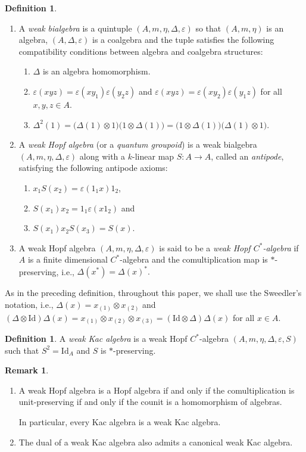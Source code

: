 \documentclass{amsart}
\theoremstyle{definition}
\newtheorem{definition}[theorem]{Definition}
\theoremstyle{theorem}
\newtheorem{remark}[theorem]{Remark}
\newcommand{\ot}{\otimes}
\begin{document}
\begin{definition}\cite{NSW,BNS}
  \begin{enumerate}
    \item A \textit{weak bialgebra} is a quintuple
      $(A,m,\eta,\Delta,\varepsilon)$ so that $(A,m,\eta)$ is an algebra,
      $(A,\Delta,\varepsilon)$ is a coalgebra and the tuple satisfies the
      following compatibility conditions between algebra and coalgebra
      structures:
  \begin{enumerate}
  \item $\Delta$ is an algebra homomorphism.
  \item
  $\varepsilon(xyz)=\varepsilon(xy_1)\varepsilon(y_2z)$
  and $\varepsilon(xyz)=\varepsilon(xy_2)\varepsilon(y_1z)$  for all $x,y, z\in A$.
  \item ${\Delta}^2(1)=\big(\Delta(1)\otimes 1\big)\big(1\otimes \Delta(1)\big)=\big(1\otimes \Delta(1)\big)\big(\Delta(1)\otimes 1\big).$
 \end{enumerate}

\item  A \textit{weak Hopf algebra} (or a \textit{quantum groupoid}) is
  a weak bialgebra $(A,m,\eta,\Delta,\varepsilon)$ along with a
  $k$-linear map $S:A\rightarrow A$, called an {\it antipode}, satisfying
  the following antipode axioms:
 \begin{enumerate}
  \item $x_1S(x_2)=\varepsilon(1_1x)1_2$,
  \item $S(x_1)x_2=1_1\varepsilon(x1_2)$ and
  \item $S(x_1)x_2 S(x_3)=S(x).$
 \end{enumerate}
\item A weak Hopf algebra $(A,m,\eta,\Delta,\varepsilon)$ is said to be
   a \textit{weak Hopf $C^*$-algebra} if $A$ is a finite dimensional
   $C^*$-algebra and the comultiplication map is $*$-preserving, i.e.,
   $\Delta(x^*)={\Delta(x)}^*.$
\end{enumerate}
  \end{definition}
 As in the preceding definition, throughout this paper, we shall use the
Sweedler's notation, i.e., $\Delta(x) = x_{(1)} \ot x_{(2)}$ and
$(\Delta \otimes \mathrm{Id})\Delta (x) = x_{(1)} \ot x_{(2)} \ot
x_{(3)} = ( \mathrm{Id}\otimes \Delta )\Delta (x)$ for all $x \in
A$. 


\begin{definition}\cite{BNS}
 A \textit{weak Kac algebra} is a weak Hopf $C^*$-algebra
 $(A,m,\eta,\Delta,\varepsilon, S)$ such that $S^2=\mathrm{Id}_A$ and $S$
 is $*$-preserving.
\end{definition}
\begin{remark}
  \begin{enumerate}
    \item A weak Hopf algebra is a Hopf algebra if and only if the
 comultiplication is unit-preserving if and only if the counit is a
 homomorphism of algebras.

 In particular, every Kac algebra is a weak Kac algebra.
\item The dual of a weak Kac algebra also admits a canonical weak Kac algebra.
  \end{enumerate}
  \end{remark}
\end{document}
